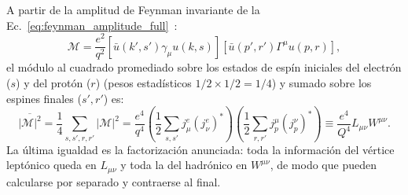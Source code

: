 \documentclass[10pt,a4paper]{article}
\begin{document}
A partir de la amplitud de Feynman invariante de la Ec.~\eqref{eq:feynman_amplitude_full}~\cite{halzen1984,thomson2013,das2003}:
\begin{equation}
\mathcal{M} = \frac{e^2}{q^2} \left[ \bar{u}(k', s') \gamma_\mu u(k, s) \right] \left[ \bar{u}(p', r') \Gamma^\mu u(p, r) \right],
\end{equation}
el módulo al cuadrado promediado sobre los estados de espín iniciales del electrón ($s$) y del protón ($r$) (pesos estadísticos $1/2 \times 1/2 = 1/4$) y sumado sobre los espines finales ($s', r'$) es:
\begin{equation}
\overline{|\mathcal{M}|^2} = \frac{1}{4} \sum_{s, s', r, r'} |\mathcal{M}|^2 = \frac{e^4}{q^4} \left( \frac{1}{2} \sum_{s, s'} j_\mu^e (j_\nu^e)^* \right) \left( \frac{1}{2} \sum_{r, r'} j_p^\mu (j_p^\nu)^* \right) \equiv \frac{e^4}{Q^4} L_{\mu\nu} W^{\mu\nu}.
\end{equation}
La última igualdad es la factorización anunciada: toda la información del vértice leptónico queda en $L_{\mu\nu}$ y toda la del hadrónico en $W^{\mu\nu}$, de modo que pueden calcularse por separado y contraerse al final.
\end{document}
